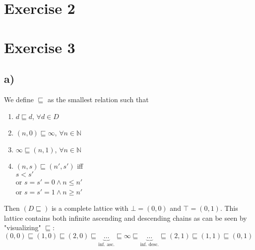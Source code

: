 \documentclass[fleqn,12pt]{article}
\begin{document}
\section*{Exercise 2}

\section*{Exercise 3}
\subsection*{a)}
We define $\sqsubseteq$ as the smallest relation such that\\
\begin{enumerate}
\item $d \sqsubseteq d$, $\forall d \in D$
\item $(n,0) \sqsubseteq \infty$, $\forall n \in \mathbb{N}$
\item $\infty \sqsubseteq (n,1)$, $\forall n \in \mathbb{N}$
\item $(n,s) \sqsubseteq (n',s')$ iff \\ 
	$s < s'$\\
	or $s=s'=0 \wedge n \leq n'$\\
	or $s=s'=1 \wedge n \geq n'$	
\end{enumerate}
Then $(D\sqsubseteq)$ is a complete lattice with $\bot=(0,0)$ and $\top=(0,1)$.
This lattice contains both infinite ascending and descending chains as can be seen by "visualizing" $\sqsubseteq$:\\
$(0,0)\sqsubseteq(1,0)\sqsubseteq(2,0)\sqsubseteq \underbrace{\dots}_\text{inf. asc.} \sqsubseteq\infty\sqsubseteq \underbrace{\dots}_\text{inf. desc.} \sqsubseteq (2,1) \sqsubseteq (1,1) \sqsubseteq (0,1)$
\newpage
\end{document}

